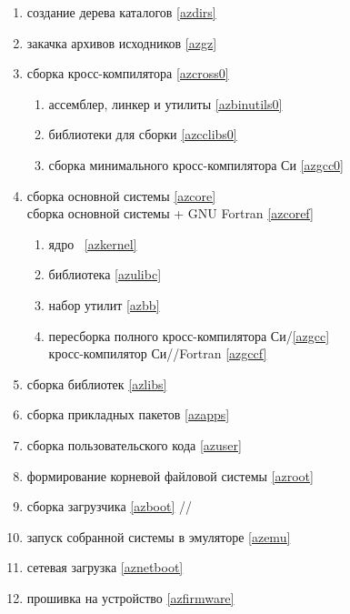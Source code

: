 \bigskip
\begin{enumerate}[nosep]
  \item {} создание дерева каталогов \ref{azdirs}
  \item {} закачка архивов исходников \ref{azgz}
  \item {} сборка кросс-компилятора \ref{azcross0}
  \begin{enumerate}
    \item {} ассемблер, линкер и утилиты \ref{azbinutils0}
    \item {} библиотеки для сборки  \ref{azcclibs0}
    \item {} сборка минимального кросс-компилятора Си \ref{azgcc0}
  \end{enumerate}
  \item {} сборка основной системы \ref{azcore}
  \\  сборка основной системы + GNU Fortran \ref{azcoref}
  \begin{enumerate}
    \item {} ядро \linux\ \ref{azkernel}
    \item {} библиотека  \ref{azulibc}
    \item {} набор утилит  \ref{azbb}
    \item {} пересборка полного кросс-компилятора Си/\cpp \ref{azgcc}
    \\  кросс-компилятор Си/\cpp/Fortran \ref{azgccf}
  \end{enumerate}
  \item {} сборка библиотек  \ref{azlibs}
  \item {} сборка прикладных пакетов  \ref{azapps}
  \item {} сборка пользовательского кода \ref{azuser}
  \item {} формирование корневой файловой системы \ref{azroot}
  \item {} сборка загрузчика \ref{azboot}
   //
  \item {} запуск собранной системы в эмуляторе \ref{azemu}
  \item {} сетевая загрузка \ref{aznetboot}
  \item {} прошивка на устройство \ref{azfirmware}
\end{enumerate}

